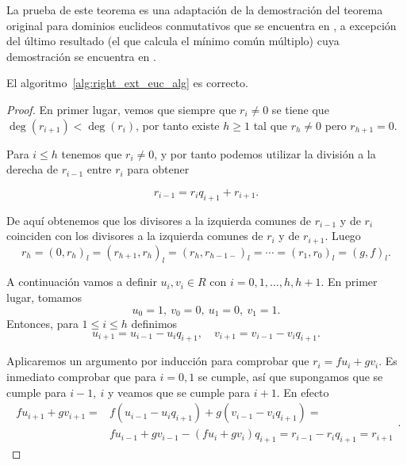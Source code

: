 La prueba de este teorema es una adaptación de la demostración del teorema original para dominios euclideos conmutativos que se encuentra en \cite{algI}, a excepción del último resultado (el que calcula el mínimo común múltiplo) cuya demostración se encuentra en \cite{bueso2003algorithmic}.
\begin{theorem}
    El algoritmo~\ref{alg:right_ext_euc_alg} es correcto.
\end{theorem}
\begin{proof}
    En primer lugar, vemos que siempre que \(r_i \neq 0\) se tiene que \(\deg(r_{i+1}) < \deg(r_i)\), por tanto existe  \(h \geq 1\) tal que \(r_h \neq 0\) pero \(r_{h+1} = 0\).

Para \(i \leq h\) tenemos que \(r_i \neq 0\), y por tanto podemos utilizar la división a la derecha de \(r_{i-1}\) entre \(r_i\) para obtener

\[
r_{i-1} = r_i q_{i+1} + r_{i+1}
.\]

De aquí obtenemos que los divisores a la izquierda comunes de \(r_{i-1}\) y de \(r_i\) coinciden con los divisores a la izquierda comunes de  \(r_i\) y de  \(r_{i+1}\). Luego
\[
r_h = (0, r_h)_l = (r_{h+1}, r_h)_l = (r_h, r_{h-1-})_l = \cdots = (r_1, r_0)_l = (g,f)_l
.\]

A continuación vamos a definir \(u_i, v_i \in R\) con \(i = 0,1, \dots, h, h+1\). En primer lugar, tomamos
\[
u_0 = 1,\ v_0 = 0,\ u_1 = 0,\ v_1 = 1
.\]
Entonces, para \(1 \leq i \leq h\) definimos
\[
u_{i+1} = u_{i-1} - u_iq_{i+1}, \quad
v_{i+1} = v_{i-1} - v_iq_{i+1}
.\]

Aplicaremos un argumento por inducción para comprobar que \(r_i = fu_i + gv_i\). Es inmediato comprobar que para \(i = 0,1\) se cumple, así que supongamos que se cumple para \(i-1,\ i\) y veamos que se cumple para \(i+1\). En efecto
\[
\begin{aligned}
f u_{i+1} + g v_{i+1} =& f(u_{i-1} - u_iq_{i+1}) + g(v_{i-1} - v_iq_{i+1}) = \\
&f u_{i-1} + g v_{i-1} - (f u_i + g v_i)q_{i+1} = r_{i-1} - r_iq_{i+1} = r_{i+1}
\end{aligned}
.\]


\end{proof}
